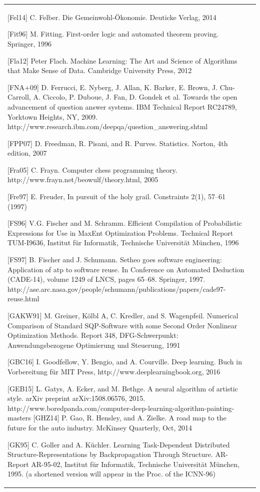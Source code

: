 \documentclass[10pt]{book}
\begin{document}
\begin{center}
\begin{tabular}{|l|l|}
[Fel14] C. Felber. Die Gemeinwohl-Ökonomie. Deuticke Verlag, 2014

[Fit96] M. Fitting. First-order logic and automated theorem proving. Springer, 1996

[Fla12] Peter Flach. Machine Learning: The Art and Science of Algorithms that Make Sense of Data. Cambridge University Press, 2012

[FNA+09] D. Ferrucci, E. Nyberg, J. Allan, K. Barker, E. Brown, J. Chu-Carroll, A. Ciccolo, P. Duboue, J. Fan, D. Gondek et al. Towards the open advancement of question answer systems. IBM Technical Report RC24789, Yorktown Heights, NY, 2009. http://www.research.ibm.com/deepqa/question\_answering.shtml

[FPP07] D. Freedman, R. Pisani, and R. Purves. Statistics. Norton, 4th edition, 2007

[Fra05] C. Frayn. Computer chess programming theory. http://www.frayn.net/beowulf/theory.html, 2005

[Fre97] E. Freuder, In pursuit of the holy grail. Constraints 2(1), 57–61 (1997)

[FS96] V.G. Fischer and M. Schramm. Efficient Compilation of Probabilistic Expressions for Use in MaxEnt Optimization Problems. Technical Report TUM-I9636, Institut für Informatik, Technische Universität München, 1996

[FS97] B. Fischer and J. Schumann. Setheo goes software engineering: Application of atp to software reuse. In Conference on Automated Deduction (CADE-14), volume 1249 of LNCS, pages 65–68. Springer, 1997. http://ase.arc.nasa.gov/people/schumann/publications/papers/cade97-reuse.html

[GAKW91] M. Greiner, Kölbl A, C. Kredler, and S. Wagenpfeil. Numerical Comparison of Standard SQP-Software with some Second Order Nonlinear Optimization Methods. Report 348, DFG-Schwerpunkt: Anwendungsbezogene Optimierung und Steuerung, 1991

[GBC16] I. Goodfellow, Y. Bengio, and A. Courville. Deep learning. Buch in Vorbereitung für MIT Press, http://www.deeplearningbook.org, 2016

[GEB15] L. Gatys, A. Ecker, and M. Bethge. A neural algorithm of artistic style. arXiv preprint arXiv:1508.06576, 2015. http://www.boredpanda.com/computer-deep-learning-algorithm-painting-masters
[GHZ14] P. Gao, R. Hensley, and A. Zielke. A road map to the future for the auto industry. McKinsey Quarterly, Oct, 2014

[GK95] C. Goller and A. Küchler. Learning Task-Dependent Distributed Structure-Representations by Backpropagation Through Structure. AR-Report AR-95-02, Institut für Informatik, Technische Universität München, 1995. (a shortened version will appear in the Proc. of the ICNN-96)


\end{tabular}
\end{center}
\end{document}
